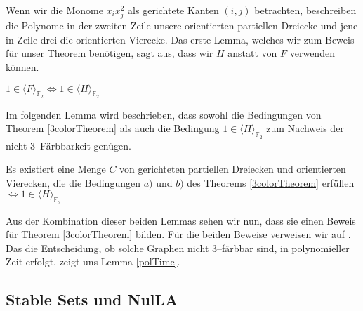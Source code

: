 \noindent Wenn wir die Monome $x_ix_j^2$ als gerichtete Kanten $(i,j)$ betrachten, beschreiben die Polynome in der zweiten Zeile unsere orientierten partiellen Dreiecke und jene in Zeile drei die orientierten Vierecke. Das erste Lemma, welches wir zum Beweis für unser Theorem benötigen, sagt aus, dass wir $H$ anstatt von $F$ verwenden können.

\begin{lemma}
$1 \in \langle F \rangle_{\mathbb{F}_2} \Leftrightarrow 1 \in \langle H \rangle_{\mathbb{F}_2}$ 
\end{lemma}

\noindent Im folgenden Lemma wird beschrieben, dass sowohl die Bedingungen von Theorem \ref{3colorTheorem} als auch die Bedingung $1 \in \langle H \rangle_{\mathbb{F}_2}$ zum Nachweis der nicht 3--Färbbarkeit genügen.

\begin{lemma}
Es existiert eine Menge $C$ von gerichteten partiellen Dreiecken und orientierten Vierecken, die die Bedingungen $a)$ und $b)$ des Theorems \ref{3colorTheorem} erfüllen $
\Leftrightarrow 1 \in \langle H \rangle_{\mathbb{F}_2}$ 
\end{lemma}

\noindent Aus der Kombination dieser beiden Lemmas sehen wir nun, dass sie einen Beweis für Theorem \ref{3colorTheorem} bilden. Für die beiden Beweise verweisen wir auf \cite{Ausgangsartikel}. Das die Entscheidung, ob solche Graphen nicht 3--färbbar sind, in polynomieller Zeit erfolgt, zeigt uns Lemma \ref{polTime}.   \cite{Ausgangsartikel}


\subsection{Stable Sets und NulLA} \label{StableNulLA}

